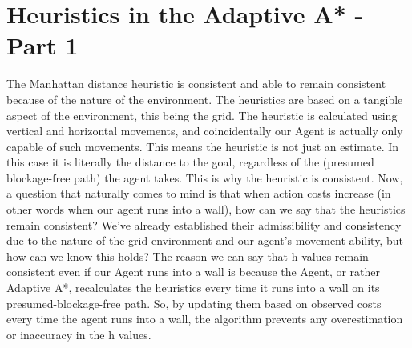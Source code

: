 \documentclass{article}
\begin{document}
\section{Heuristics in the Adaptive A* - Part 1}
The Manhattan distance heuristic is consistent and able to remain consistent because of the nature of the environment.
\newline
The heuristics are based on a tangible aspect of the environment, this being the grid. The heuristic is calculated using vertical and horizontal movements, and coincidentally our Agent is actually only capable of such movements. This means the heuristic is not just an estimate. In this case it is literally the distance to the goal, regardless of the (presumed blockage-free path) the agent takes. This is why the heuristic is consistent.
\newline
\newline
Now, a question that naturally comes to mind is that when action costs increase (in other words when our agent runs into a wall), how can we say that the heuristics remain consistent? We've already established their admissibility and consistency due to the nature of the grid environment and our agent's movement ability, but how can we know this holds?
The reason we can say that h values remain consistent even if our Agent runs into a wall is because the Agent, or rather Adaptive A*, recalculates the heuristics every time it runs into a wall on its presumed-blockage-free path. So, by updating them based on observed costs every time the agent runs into a wall, the algorithm prevents any overestimation or inaccuracy in the h values.
\end{document}
